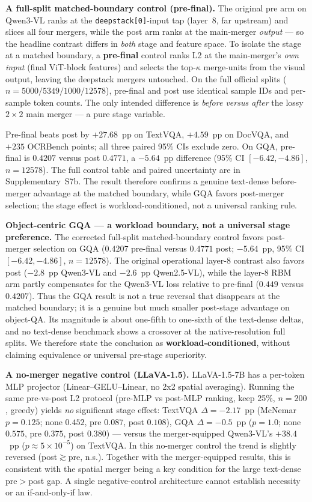 \documentclass[journal]{IEEEtran}
\begin{document}
\textbf{A full-split matched-boundary control (pre-final).} The original pre arm
on Qwen3-VL ranks at the \texttt{deepstack[0]}-input tap (layer~8, far upstream)
and slices all four mergers, while the post arm ranks at the main-merger
\emph{output} --- so the headline contrast differs in \emph{both} stage and
feature space. To isolate the stage at a matched boundary, a \textbf{pre-final}
control ranks L2 at the main-merger's \emph{own input} (final ViT-block features)
and selects the top-$\kappa$ merge-units from the visual output, leaving the
deepstack mergers untouched. On the full official splits ($n=5000/5349/1000/
12578$), pre-final and post use identical sample IDs and per-sample token
counts. The only intended difference is \emph{before versus after} the lossy
$2\!\times\!2$ main merger --- a pure stage variable.

Pre-final beats post by $+27.68$~pp on TextVQA, $+4.59$~pp on DocVQA, and
$+235$ OCRBench points; all three paired 95\% CIs exclude zero. On GQA,
pre-final is $0.4207$ versus post $0.4771$, a $-5.64$~pp difference (95\% CI
$[-6.42,-4.86]$, $n=12578$). The full control table and paired uncertainty are
in Supplementary~S7b. The result therefore confirms a genuine text-dense
before-merger advantage at the matched boundary, while GQA favors post-merger
selection; the stage effect is workload-conditioned, not a universal ranking rule.

\textbf{Object-centric GQA --- a workload boundary, not a universal stage preference.}
The corrected full-split matched-boundary control favors post-merger selection
on GQA ($0.4207$ pre-final versus $0.4771$ post; $-5.64$~pp, 95\% CI
$[-6.42,-4.86]$, $n=12578$). The original operational layer-8 contrast also
favors post ($-2.8$~pp Qwen3-VL and $-2.6$~pp Qwen2.5-VL), while the layer-8
RBM arm partly compensates for the Qwen3-VL loss relative to pre-final
($0.449$ versus $0.4207$). Thus the GQA result is not a true reversal that
disappears at the matched boundary; it is a genuine but much smaller post-stage
advantage on object-QA. Its magnitude is about one-fifth to one-sixth of the
text-dense deltas, and no text-dense benchmark shows a crossover at the
native-resolution full splits. We therefore state the conclusion as
\textbf{workload-conditioned}, without claiming equivalence or universal
pre-stage superiority.

\textbf{A no-merger negative control (LLaVA-1.5).} LLaVA-1.5-7B has a per-token MLP projector
(Linear--GELU--Linear, no 2x2 spatial averaging). Running the same pre-vs-post
L2 protocol (pre-MLP vs post-MLP ranking, keep 25\%, $n{=}200$, greedy) yields
\emph{no} significant stage effect: TextVQA $\Delta = -2.17$~pp (McNemar
$p{=}0.125$; none $0.452$, pre $0.087$, post $0.108$), GQA $\Delta = -0.5$~pp
($p{=}1.0$; none $0.575$, pre $0.375$, post $0.380$) --- versus the
merger-equipped Qwen3-VL's $+38.4$~pp ($p{\approx}5{\times}10^{-5}$) on TextVQA.
In this no-merger control the trend is slightly reversed
(post$\gtrsim$pre, n.s.). Together with the merger-equipped results, this is
consistent with the spatial merger being a key condition for the large
text-dense pre$>$post gap. A single negative-control architecture cannot
establish necessity or an if-and-only-if law.
\end{document}
